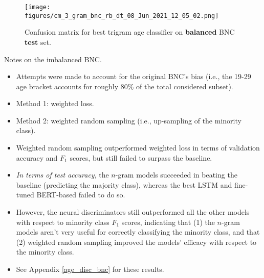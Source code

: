 \begin{figure}[H]
    \centering
    \texttt{[image: figures/cm\_3\_gram\_bnc\_rb\_dt\_08\_Jun\_2021\_12\_05\_02.png]}
    \caption{Confusion matrix for best trigram age classifier on \textbf{balanced} BNC \textbf{test} set.}
    \label{fig:cm_trigram_bnc_rb}
\end{figure}

Notes on the imbalanced BNC.
\begin{itemize}
    \item Attempts were made to account for the original BNC's bias (i.e., the 19-29 age bracket accounts for roughly 80\% of the total considered subset).
    \item Method 1: weighted loss.
    \item Method 2: weighted random sampling (i.e., up-sampling of the minority class).
    \item Weighted random sampling outperformed weighted loss in terms of validation accuracy and $F_1$ scores, but still failed to surpass the baseline.
    \item  \textit{In terms of test accuracy}, the $n$-gram models succeeded in beating the baseline (predicting the majority class), whereas the best LSTM and fine-tuned BERT-based failed to do so.
    \item However, the neural discriminators still outperformed all the other models with respect to minority class $F_1$ scores, indicating that (1) the $n$-gram models aren't very useful for correctly classifying the minority class, and that (2) weighted random sampling improved the models' efficacy with respect to the minority class.
    \item See Appendix \ref{age_disc_bnc} for these results.
\end{itemize}


